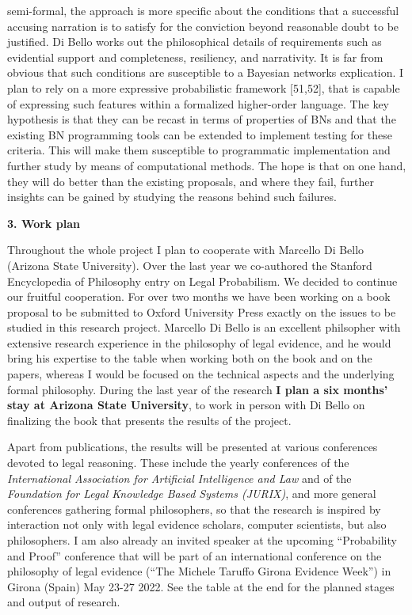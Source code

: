 \documentclass[11pt,dvipsnames,enabledeprecatedfontcommands]{scrartcl}
\begin{document}
semi-formal, the approach is more specific about the conditions that a
successful accusing narration is to satisfy for the conviction beyond
reasonable doubt to be justified. Di Bello works out the philosophical
details of requirements such as evidential support and completeness,
resiliency, and narrativity. It is far from obvious that such conditions
are susceptible to a Bayesian networks explication. I plan to rely on a
more expressive probabilistic framework {[}51,52{]}, that is capable of
expressing such features within a formalized higher-order language. The
key hypothesis is that they can be recast in terms of properties of BNs
and that the existing BN programming tools can be extended to implement
testing for these criteria. This will make them susceptible to
programmatic implementation and further study by means of computational
methods. The hope is that on one hand, they will do better than the
existing proposals, and where they fail, further insights can be gained
by studying the reasons behind such failures.

\vspace{1mm}

\noindent \large \textbf{3. Work plan}

\vspace{1mm} \normalsize

Throughout the whole project I plan to cooperate with Marcello Di Bello
(Arizona State University). Over the last year we co-authored the
Stanford Encyclopedia of Philosophy entry on Legal Probabilism. We
decided to continue our fruitful cooperation. For over two months we
have been working on a book proposal to be submitted to Oxford
University Press exactly on the issues to be studied in this research
project. Marcello Di Bello is an excellent philsopher with extensive
research experience in the philosophy of legal evidence, and he would
bring his expertise to the table when working both on the book and on
the papers, whereas I would be focused on the technical aspects and the
underlying formal philosophy. During the last year of the research
\textbf{I plan a six months' stay at Arizona State University}, to work
in person with Di Bello on finalizing the book that presents the results
of the project.

Apart from publications, the results will be presented at various
conferences devoted to legal reasoning. These include the yearly
conferences of the
\emph{International Association for Artificial Intelligence and Law} and
of the \emph{Foundation for Legal Knowledge Based Systems (JURIX)}, and
more general conferences gathering formal philosophers, so that the
research is inspired by interaction not only with legal evidence
scholars, computer scientists, but also philosophers. I am also already
an invited speaker at the upcoming ``Probability and Proof'' conference
that will be part of an international conference on the philosophy of
legal evidence (``The Michele Taruffo Girona Evidence Week'') in Girona
(Spain) May 23-27 2022. See the table at the end for the planned stages
and output of research.
\end{document}
